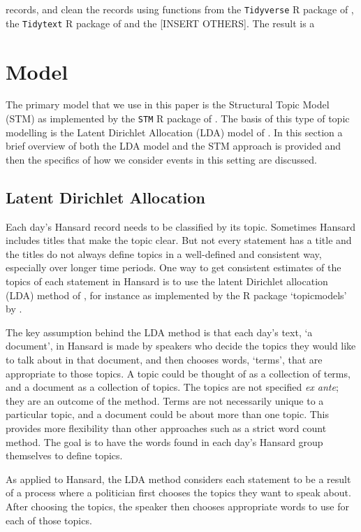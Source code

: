 \documentclass[12pt,]{article}
\begin{document}
records, and clean the records using functions from the
\texttt{Tidyverse} R package of \citet{Wickham2017}, the
\texttt{Tidytext} R package of \citet{SilgeRobinson2016} and the
{[}INSERT OTHERS{]}. The result is a

\section{Model}\label{model}

The primary model that we use in this paper is the Structural Topic
Model (STM) as implemented by the \texttt{STM} R package of
\citet{RobertsStewartAiroldiRPackage}. The basis of this type of topic
modelling is the Latent Dirichlet Allocation (LDA) model of
\citet{Blei2003latent}. In this section a brief overview of both the LDA
model and the STM approach is provided and then the specifics of how we
consider events in this setting are discussed.

\subsection{Latent Dirichlet
Allocation}\label{latent-dirichlet-allocation}

Each day's Hansard record needs to be classified by its topic. Sometimes
Hansard includes titles that make the topic clear. But not every
statement has a title and the titles do not always define topics in a
well-defined and consistent way, especially over longer time periods.
One way to get consistent estimates of the topics of each statement in
Hansard is to use the latent Dirichlet allocation (LDA) method of
\citet{Blei2003latent}, for instance as implemented by the R package
`topicmodels' by \citet{Grun2011}.

The key assumption behind the LDA method is that each day's text, `a
document', in Hansard is made by speakers who decide the topics they
would like to talk about in that document, and then chooses words,
`terms', that are appropriate to those topics. A topic could be thought
of as a collection of terms, and a document as a collection of topics.
The topics are not specified \emph{ex ante}; they are an outcome of the
method. Terms are not necessarily unique to a particular topic, and a
document could be about more than one topic. This provides more
flexibility than other approaches such as a strict word count method.
The goal is to have the words found in each day's Hansard group
themselves to define topics.

As applied to Hansard, the LDA method considers each statement to be a
result of a process where a politician first chooses the topics they
want to speak about. After choosing the topics, the speaker then chooses
appropriate words to use for each of those topics.
\end{document}
